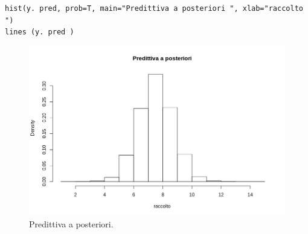 \begin{lstlisting}[style=R]
hist(y. pred, prob=T, main="Predittiva a posteriori ", xlab="raccolto ")
lines (y. pred )
\end{lstlisting}

\begin{figure}
    \centering
    \includegraphics[totalheight=10cm]{img/esercizio11-2-6.png}
    \caption{   Predittiva a posteriori.}
\end{figure}
